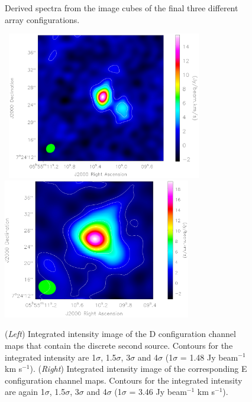 \documentclass[manuscript]{aastex}
\begin{document}
\clearpage

\begin{figure}
{}
\caption{Derived spectra from the image cubes of the final three different array configurations.\label{fig1}}
\label{fig:fig1}
\end{figure}

\clearpage
\begin{figure}
\mbox{
          \includegraphics[trim=0pt 10pt 40pt 10pt, clip, width=8.5cm]{apj.eps}
          \includegraphics[trim=0pt 10pt 40pt 10pt, clip, width=8.2cm]{apj_e.eps}
         }
\caption{(\textit{Left}) Integrated intensity image of the D configuration channel maps that contain the discrete second source. Contours for the integrated intensity are 1$\sigma$, 1.5$\sigma$, 3$\sigma$ and 4$\sigma$ (1$\sigma$ = 1.48 Jy beam${}^{-1}$ km s${}^{-1}$). (\textit{Right}) Integrated intensity image of the corresponding E configuration channel maps. Contours for the integrated intensity are again 1$\sigma$, 1.5$\sigma$, 3$\sigma$ and 4$\sigma$ (1$\sigma$ = 3.46 Jy beam${}^{-1}$ km s${}^{-1}$).}
\label{fig:fig3}
\end{figure}


\clearpage
\end{document}
